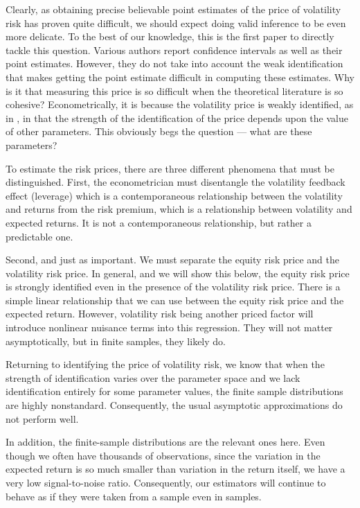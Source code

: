 \documentclass[11pt, letterpaper, twoside, final]{article}
\begin{document}
Clearly, as obtaining precise believable point estimates of the price of volatility risk has proven quite difficult, we should expect doing valid inference to be even more delicate. To the best of our knowledge, this is the first paper to directly tackle this question. Various authors report confidence intervals as well as their point estimates. However, they do not take into account the weak identification that makes getting the point estimate difficult in computing these estimates.   Why is it that measuring this price is so difficult when the theoretical literature is so cohesive? Econometrically, it is because the volatility price is weakly identified, as in \textcite{andrews2012estimation}, in that the strength of the identification of the price depends upon the value of other parameters. This obviously begs the question --- what are these parameters?  

To estimate the risk prices, there are three different phenomena that must be distinguished. First, the econometrician must disentangle the volatility feedback effect (leverage) which is a contemporaneous relationship between the volatility and returns from the risk premium, which is a relationship between volatility and expected returns. It is not a contemporaneous relationship, but rather a predictable one.  

Second, and just as important. We must separate the equity risk price and the volatility risk price.  In general, and we will show this below, the equity risk price is strongly identified even in the presence of the volatility risk price.  There is a simple linear relationship that we can use between the equity risk price and the expected return. However, volatility risk being another priced factor will introduce nonlinear nuisance terms into this regression.  They will not matter asymptotically, but in finite samples, they likely do.

Returning to identifying the price of volatility risk, we know that when the strength of identification varies over the parameter space and we lack identification entirely for some parameter values, the finite sample distributions are highly nonstandard.  Consequently, the usual asymptotic   approximations do not perform well. 

In addition, the finite-sample distributions are the relevant ones here.  Even though we often have thousands of observations, since the variation in the expected return is so much smaller than variation in the return itself, we have a very low signal-to-noise ratio. Consequently, our estimators will continue to behave as if they were taken from a  sample even in  samples.
\end{document}
